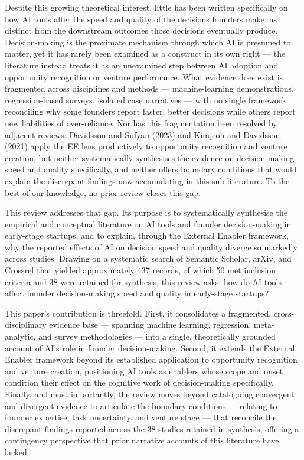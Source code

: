 \documentclass[11pt, a4paper]{article}
\begin{document}
Despite this growing theoretical interest, little has been written specifically on how AI tools alter the speed and quality of the decisions founders make, as distinct from the downstream outcomes those decisions eventually produce. Decision-making is the proximate mechanism through which AI is presumed to matter, yet it has rarely been examined as a construct in its own right — the literature instead treats it as an unexamined step between AI adoption and opportunity recognition or venture performance. What evidence does exist is fragmented across disciplines and methods — machine-learning demonstrations, regression-based surveys, isolated case narratives — with no single framework reconciling why some founders report faster, better decisions while others report new liabilities of over-reliance. Nor has this fragmentation been resolved by adjacent reviews: Davidsson and Sufyan (2023) and Kimjeon and Davidsson (2021) apply the EE lens productively to opportunity recognition and venture creation, but neither systematically synthesises the evidence on decision-making speed and quality specifically, and neither offers boundary conditions that would explain the discrepant findings now accumulating in this sub-literature. To the best of our knowledge, no prior review closes this gap.

This review addresses that gap. Its purpose is to systematically synthesise the empirical and conceptual literature on AI tools and founder decision-making in early-stage startups, and to explain, through the External Enabler framework, why the reported effects of AI on decision speed and quality diverge so markedly across studies. Drawing on a systematic search of Semantic Scholar, arXiv, and Crossref that yielded approximately 437 records, of which 50 met inclusion criteria and 38 were retained for synthesis, this review asks: how do AI tools affect founder decision-making speed and quality in early-stage startups?

This paper's contribution is threefold. First, it consolidates a fragmented, cross-disciplinary evidence base — spanning machine learning, regression, meta-analytic, and survey methodologies — into a single, theoretically grounded account of AI's role in founder decision-making. Second, it extends the External Enabler framework beyond its established application to opportunity recognition and venture creation, positioning AI tools as enablers whose scope and onset condition their effect on the cognitive work of decision-making specifically. Finally, and most importantly, the review moves beyond cataloguing convergent and divergent evidence to articulate the boundary conditions — relating to founder expertise, task uncertainty, and venture stage — that reconcile the discrepant findings reported across the 38 studies retained in synthesis, offering a contingency perspective that prior narrative accounts of this literature have lacked.
\end{document}
